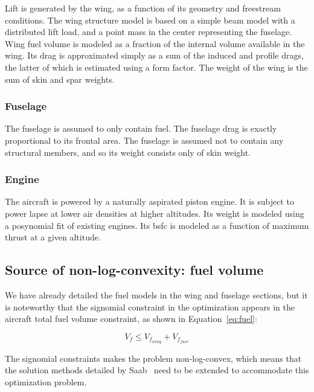 Lift is generated by the wing, as a function of its geometry and freestream conditions.
The wing structure model is based on a simple beam model with a distributed lift load,
and a point mass in the center representing the fuselage.
Wing fuel volume is modeled as a fraction of the internal volume available in the wing.
Its drag is
approximated simply as a sum of the induced and profile drags, the latter of which is estimated using a
form factor. The weight of the wing is the sum of skin and spar weights.

\subsubsection{Fuselage}

The fuselage is assumed to only contain fuel. The fuselage drag is exactly proportional to its frontal area.
The fuselage is assumed not to contain any structural members, and so its weight consists only of skin weight.

\subsubsection{Engine}

The aircraft is powered by a naturally aspirated piston engine. It is subject to
power lapse at lower air densities at higher altitudes. Its weight is modeled using a posynomial fit of existing
engines. Its \gls{bsfc} is modeled as a function of maximum thrust at a given altitude.

\subsection{Source of non-log-convexity: fuel volume}
We have already detailed the fuel models in the wing and fuselage sections, but it is noteworthy that
the signomial constraint in the optimization appears in the aircraft total fuel volume constraint,
as shown in Equation~\ref{eq:fuel}:

\begin{equation}
\label{eq:fuel}
V_f \leq V_{f_{wing}} + V_{f_{fuse}} 
\end{equation}

The signomial constraints makes the problem non-log-convex, which means that the solution methods
detailed by Saab~\cite{Saab2018} need to be extended to accommodate this optimization problem.
